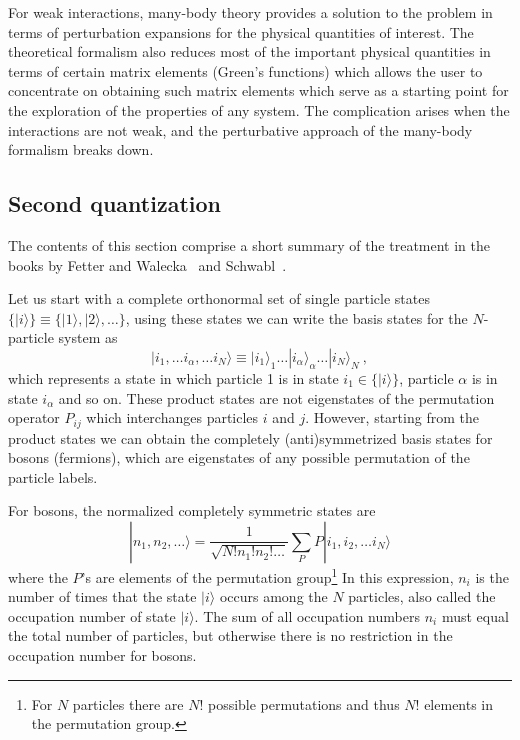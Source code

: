 \documentclass[oneside,11pt]{memoir}
\begin{document}
For weak interactions, many-body theory provides a solution to the problem in
terms of perturbation expansions for the physical quantities of interest.   The
theoretical formalism also reduces most of the important physical quantities in
terms of certain matrix elements (Green's functions) which allows the user to
concentrate on obtaining such matrix elements which serve as a starting point
for the exploration of the properties of any system.   The complication arises
when the interactions are not weak, and the perturbative approach of the
many-body formalism breaks down.   


\subsection{Second quantization}

The contents of this section comprise a short summary of the treatment in the
books by Fetter and Walecka~\cite{fetter2003quantum} and
Schwabl~\cite{schwabl2005advanced}.  

Let us start with a complete orthonormal set of single particle states $\lbrace
|i\rangle \rbrace \equiv \lbrace |1\rangle, |2\rangle, \ldots \rbrace$, using these
states we can write the basis states for the $N$-particle system as
\begin{equation}
   | i_{1}, \ldots i_{\alpha}, \ldots i_{N} \rangle \equiv 
   | i_{1}\rangle_{1} \ldots |i_{\alpha}\rangle_{\alpha} \ldots 
   | i_{N} \rangle_{N} ~,
\end{equation} 
which represents a state in which particle 1 is in state $i_{1} \in \lbrace
|i\rangle \rbrace$, particle $\alpha$ is in state $i_{\alpha}$ and so on.
These product states are not eigenstates of the permutation operator $P_{ij}$
which interchanges particles $i$ and $j$.  However, starting from the product
states we can obtain the completely (anti)symmetrized basis states for bosons
(fermions), which are eigenstates of any possible permutation of the
particle labels.  

For bosons, the normalized completely symmetric states are
\begin{equation} 
  | n_{1},  n_{2}, \ldots \rangle = 
  \frac{1}{\sqrt{N!n_{1}!n_{2}!\ldots}} \sum_{P}  
    P | i_{1},  i_{2}, \ldots i_{N} \rangle
\end{equation} 
where the $P$'s are elements of the permutation group\footnote{For $N$
particles there are $N!$ possible permutations and thus $N!$ elements in the
permutation group.}  In this expression, $n_{i}$ is the number of times that
the state $|i\rangle$ occurs among the $N$ particles, also called the
occupation number of state $|i\rangle$.  The sum of all occupation numbers
$n_{i}$ must equal the total number of particles, but otherwise there is no
restriction in the occupation number for bosons.
\end{document}
